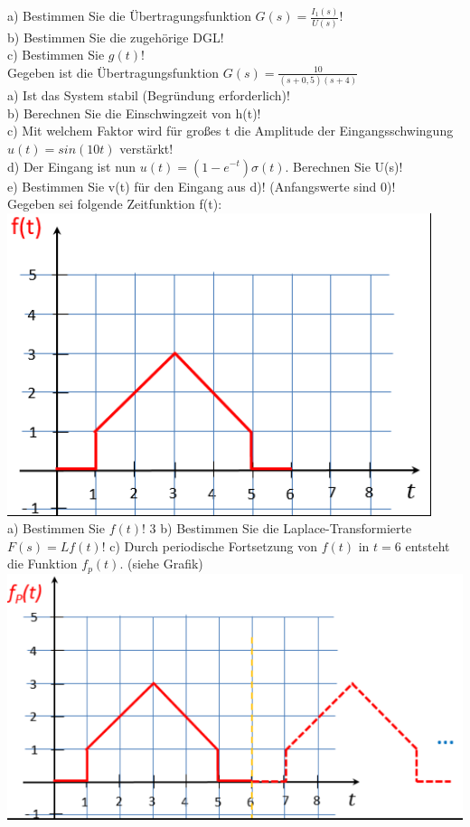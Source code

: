 \documentclass[A4]{scrartcl}
\begin{document}
  a) Bestimmen Sie die Übertragungsfunktion $G(s) = \frac{I_1(s)}{U(s)}$!\\
  b) Bestimmen Sie die zugehörige DGL!\\
  c) Bestimmen Sie $g(t)$!\\
  \newpage
  Gegeben ist die Übertragungsfunktion $G(s) = \frac{10}{(s+0,5)(s+4)}$\\
  a) Ist das System stabil (Begründung erforderlich)!\\
  b) Berechnen Sie die Einschwingzeit von h(t)!\\
  c) Mit welchem Faktor wird für großes t die Amplitude der Eingangsschwingung $u(t) = sin(10t)$ verstärkt!\\
  d) Der Eingang ist nun $u(t) = (1-e^{-t})\sigma(t)$. Berechnen Sie U(s)!\\
  e) Bestimmen Sie v(t) für den Eingang aus d)! (Anfangswerte sind 0)!\\
  \newpage
  Gegeben sei folgende Zeitfunktion f(t):\\
  \includegraphics{zeitfunktion2.png}\\
  a) Bestimmen Sie $f(t)$! 3
  b) Bestimmen Sie die Laplace-Transformierte $F(s) = L{f(t)}$!
  c) Durch periodische Fortsetzung von $f(t)$ in $t=6$ entsteht die Funktion $f_p(t)$. (siehe Grafik)\\
  \includegraphics{zeitfunktion2a.png}\\
\end{document}
